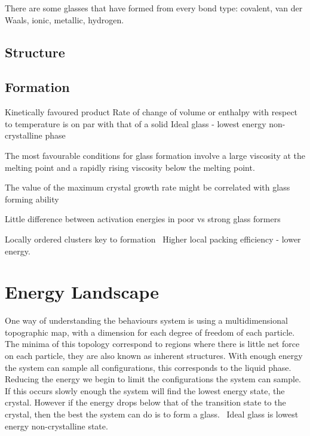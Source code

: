 There are some glasses that have formed from every bond type: covalent, van der Waals, ionic, metallic, hydrogen.~\cite{turnbull:69}

\subsection{Structure}


\subsection{Formation}
Kinetically favoured product
Rate of change of volume or enthalpy with respect to temperature is on par with that of a solid
Ideal glass - lowest energy non-crystalline phase

The most favourable conditions for glass formation involve a large viscosity at the melting point and a rapidly rising viscosity below the melting point.~\cite{uhlmann:72}



The value of the maximum crystal growth rate might be correlated with glass forming ability~\cite{tang:13}

Little difference between activation energies in poor vs strong glass formers~\cite{tang:13}

Locally ordered clusters key to formation~\cite{yang:12} Higher local packing efficiency - lower energy. 

\section{Energy Landscape}
One way of understanding the behaviours system is using a multidimensional topographic map, with a dimension for each degree of freedom of each particle. The minima of this topology correspond to regions where there is little net force on each particle, they are also known as inherent structures. With enough energy the system can sample all configurations, this corresponds to the liquid phase. Reducing the energy we begin to limit the configurations the system can sample. If this occurs slowly enough the system will find the lowest energy state, the crystal. However if the energy drops below that of the transition state to the crystal, then the best the system can do is to form a glass.~\cite{stillinger:95} Ideal glass is lowest energy non-crystalline state.

\begin{figure}
\end{figure}


